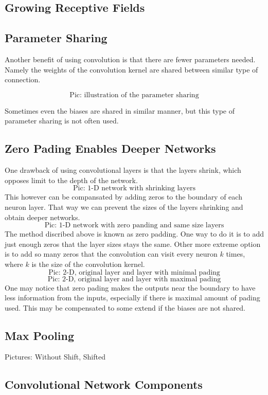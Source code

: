 \documentclass[]{article}
\begin{document}
\subsection{Growing Receptive Fields}

\subsection{Parameter Sharing}
Another benefit of using convolution is that there are fewer parameters needed.
Namely the weights of the convolution kernel are shared between similar type of
connection.

\[
\text{Pic: illustration of the parameter sharing}
\]

Sometimes even the biases are shared in similar manner, but this type of
parameter sharing is not often used.

\subsection{Zero Pading Enables Deeper Networks}
One drawback of using convolutional layers is that the layers shrink, which
opposes limit to the depth of the network.
\[
\text{Pic: 1-D network with shrinking layers}
\]
This however can be compansated by
adding zeros to the boundary of each neuron layer. That way we can prevent the
sizes of the layers shrinking and obtain deeper networks.
\[
\text{Pic: 1-D network with zero panding and same size layers}
\]
The method discribed above is known as zero padding. One way to do it is to add
just enough zeros that the layer sizes stays the same. Other more extreme option
is to add so many zeros that the convolution can visit every neuron $k$ times,
where $k$ is the size of the convolution kernel.
\[
\text{Pic: 2-D, original layer and layer with minimal pading}
\]
\[
\text{Pic: 2-D, original layer and layer with maximal pading}
\]
One may notice that zero pading makes the outputs near the boundary to have less
information from the inputs, especially if there is maximal amount of pading
used. This may be compensated to some extend if the biases are not shared.
\subsection{Max Pooling}
Pictures: Without Shift, Shifted

\subsection{Convolutional Network Components}
\end{document}
